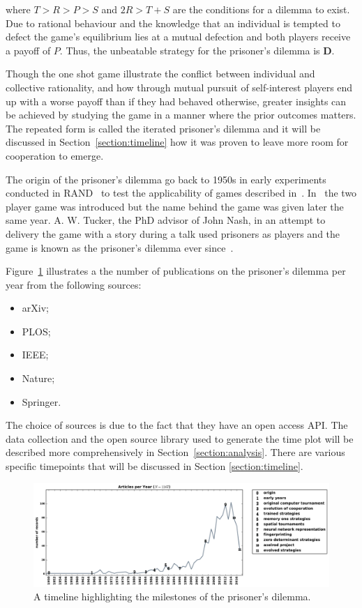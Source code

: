 \documentclass{article}
\begin{document}
where \(T > R > P > S \) and \(2R > T + S\) are the conditions for a dilemma
to exist. Due to rational behaviour and the knowledge that an individual is tempted
to defect the game's equilibrium lies at a mutual defection and both players
receive a payoff of \(P\). Thus, the unbeatable strategy for the prisoner's dilemma
is \textbf{D}.

Though the one shot game illustrate the conflict between individual and collective
rationality, and how through mutual pursuit of self-interest players end up with
a worse payoff than if they had behaved otherwise, greater insights can be achieved 
by studying the game in a manner where the prior outcomes matters. The
repeated form is called the iterated prisoner's dilemma and it will be discussed
in Section~\ref{section:timeline} how it was proven to leave more room for cooperation
to emerge.

The origin of the prisoner's dilemma go back to 1950s in early experiments
conducted in RAND~\cite{Flood1958} to test the applicability of games
described in~\cite{VonNeumann1944}. In~\cite{Flood1958} the two player game was
introduced but the name behind the game was given later the same year. 
A. W. Tucker, the PhD advisor of John Nash, in an attempt to delivery the game
with a story during a talk used prisoners as players and the game is known as 
the prisoner's dilemma ever since~\cite{Tucker1983}.

Figure~\ref{fig:timeline} illustrates a the number of publications on the 
prisoner's dilemma per year from the following sources:

\begin{itemize}
     \item arXiv;
     \item PLOS;
     \item IEEE;
     \item Nature;
     \item Springer.
\end{itemize}

The choice of sources is due to the fact that they have an open access API. %
The data collection and the open source library used to generate the time plot 
will be described more comprehensively in Section~\ref{section:analysis}.
There are various specific timepoints that will be discussed in Section
\ref{section:timeline}.

\begin{figure}[!htbp]
    \centering
    \includegraphics[width=\textwidth]{assets/images/timeline.pdf}
    \caption{\label{fig:timeline} A timeline highlighting the milestones of the 
    prisoner's dilemma.}
\end{figure}
\end{document}
